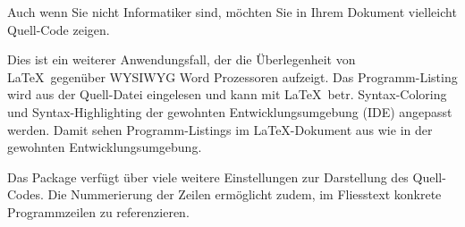 
Auch wenn Sie nicht Informatiker sind, möchten Sie in Ihrem Dokument vielleicht Quell-Code zeigen.

\begin{leftbar} 
Dies ist ein weiterer Anwendungsfall, der die Überlegenheit von \LaTeX\ gegenüber WYSIWYG Word Prozessoren aufzeigt. Das Programm-Listing wird aus der Quell-Datei eingelesen und kann mit \LaTeX\ betr. Syntax-Coloring und Syntax-Highlighting der gewohnten Entwicklungsumgebung (IDE) angepasst werden. Damit sehen Programm-Listings im \LaTeX-Dokument aus wie in der gewohnten Entwicklungsumgebung.  
\end{leftbar}

Das Package verfügt über viele weitere Einstellungen zur Darstellung des Quell-Codes. Die Nummerierung der Zeilen ermöglicht zudem, im Fliesstext konkrete Programmzeilen zu referenzieren.
